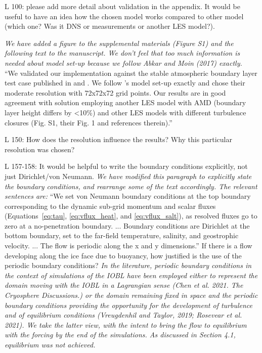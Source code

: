 \documentclass[tc, manuscript]{copernicus}
\begin{document}
L 100: please add more detail about validation in the appendix. It would be useful to have an idea how the chosen model works compared to other model (which one? Was it DNS or measurements or another LES model?).

\textit{We have added a figure to the supplemental materials (Figure S1) and the following text to the manuscript. We don't feel that too much information is needed about model set-up because we follow Abkar and Moin (2017) exactly.}\\
``We validated our implementation against the stable atmospheric boundary layer test case published in \citet{abkar_large-eddy_2017} and \citet{stoll_large-eddy_2008}. We follow \citet[]['s]{abkar_large-eddy_2017}'s model set-up exactly and chose their moderate resolution with 72x72x72 grid points. Our results are in good agreement with \citet[]['s]{abkar_large-eddy_2017} solution employing another LES model with AMD (boundary layer height differs by <10\%) and other LES models with different turbulence closures (Fig. S1, their Fig. 1 and references therein).''

L 150: How does the resolution influence the results? Why this particular resolution was chosen?


L 157-158: It would be helpful to write the boundary conditions explicitly, not just Dirichlet/von Neumann. 
\textit{We have modified this paragraph to explicitly state the boundary conditions, and rearrange some of the text accordingly. The relevant sentences are:}
``We set von Neumann boundary conditions at the top boundary corresponding to the dynamic sub-grid momentum and scalar fluxes (Equations~\ref{eq:tau}, \ref{eq:vflux_heat}, and \ref{eq:vflux_salt}), as resolved fluxes go to zero at a no-penetration boundary. ... Boundary conditions are Dirichlet at the bottom boundary, set to the far-field temperature, salinity, and geostrophic velocity. ... The flow is periodic along the x and y dimensions.''
If there is a flow developing along the ice face due to buoyancy, how justified is the use of the periodic boundary conditions?
\textit{In the literature, periodic boundary conditions in the context of simulations of the IOBL have been employed either to represent the domain moving with the IOBL in a Lagrangian sense (Chen et al. 2021. The Cryosphere Discussions.) or the domain remaining fixed in space and the periodic boundary conditions providing the opportunity for the development of turbulence and of equilibrium conditions (Vreugdenhil and Taylor, 2019; Rosevear et al. 2021). We take the latter view, with the intent to bring the flow to equilibrium with the forcing by the end of the simulations. As discussed in Section 4.1, equilibrium was not achieved. }
\end{document}
